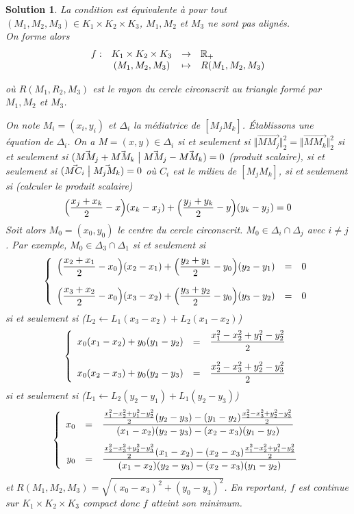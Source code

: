 \documentclass[12pt]{article}
\newtheorem{solution}{Solution}[section]
\theoremstyle{remark}
\newcommand{\function}[5]{
	$$
	\begin{array}{rccl}
		#1: & #2 & \to & #3 \\
		& #4 & \mapsto & #5
	\end{array}
	$$
}
\numberwithin{equation}{section}
\begin{document}
\begin{solution}
	La condition est équivalente à pour tout $(M_{1},M_{2},M_{3})\in K_{1}\times K_{2}\times K_{3}$, $M_{1},M_{2}$ et $M_{3}$ ne sont pas alignés.\\
	On forme alors \function{f}{K_1\times K_2\times K_3}{\R_+}{(M_1,M_2,M_3)}{R(M_1,M_2,M_3)}
	où $R(M_{1},R_{2},M_{3})$ est le rayon du cercle circonscrit au triangle formé par $M_{1},M_{2}$ et $M_{3}$.

	On note $M_{i}=(x_{i},y_{i})$ et $\Delta_{i}$ la médiatrice de $[M_{j}M_{k}]$. Établissons une équation de $\Delta_{i}$. On a $M=(x,y)\in\Delta_{i}$ si et seulement si $\Vert \vec{MM_{j}}\Vert_{2}^{2}=\Vert\vec{MM_{k}}\Vert_{2}^{2}$ si et seulement si $(\vec{MM_{j}}+\vec{MM_{k}}\bigm|\vec{MM_{j}}-\vec{MM_{k}})=0$ (produit scalaire), si et seulement si $(\vec{MC_{i}}\bigm|\vec{M_{j}M_{k}})=0$ où $C_{i}$ est le milieu de $[M_{j}M_{k}]$, si et seulement si (calculer le produit scalaire)
	$$\Bigl(\frac{x_{j}+x_{k}}{2}-x\Bigr)(x_{k}-x_{j})+\Bigl(\frac{y_{j}+y_{k}}{2}-y\Bigr)(y_{k}-y_{j})=0$$
	Soit alors $M_{0}=(x_{0},y_{0})$ le centre du cercle circonscrit. $M_{0}\in\Delta_{i}\cap\Delta_{j}$ avec $i\neq j$. Par exemple, $M_{0}\in\Delta_{3}\cap\Delta_{1}$ si et seulement si
	$$
	\left\{
		\begin{array}[]{rcl}
			\Bigl(\dfrac{x_{2}+x_{1}}{2}-x_{0}\Bigr)(x_{2}-x_{1})+\Bigl(\dfrac{y_{2}+y_{1}}{2}-y_{0}\Bigr)(y_{2}-y_{1}) &= &0\\[0.5cm]
			\Bigl(\dfrac{x_{3}+x_{2}}{2}-x_{0}\Bigr)(x_{3}-x_{2})+\Bigl(\dfrac{y_{3}+y_{2}}{2}-y_{0}\Bigr)(y_{3}-y_{2}) &= &0
		\end{array}	
	\right.
	$$
	si et seulement si ($L_{2}\leftarrow L_{1}(x_{3}-x_{2})+L_{2}(x_{1}-x_{2})$)
	$$
	\left\{
		\begin{array}[]{rcl}
			x_{0}(x_{1}-x_{2})+y_{0}(y_{1}-y_{2})&=&\dfrac{x_{1}^{2}-x_{2}^{2}+y_{1}^{2}-y_{2}^{2}}{2}\\[0.5cm]
			x_{0}(x_{2}-x_{3})+y_{0}(y_{2}-y_{3})&=&\dfrac{x_{2}^{2}-x_{3}^{2}+y_{2}^{2}-y_{3}^{2}}{2}
		\end{array}	
	\right.
	$$
	si et seulement si ($L_{1}\leftarrow L_{2}(y_{2}-y_{1})+L_{1}(y_{2}-y_{3})$)
	$$
	\left\{
		\begin{array}[]{rcl}
			x_{0} &= & \dfrac{\frac{x_{1}^{2}-x_{2}^{2}+y_{1}^{2}-y_{2}^{2}}{2}(y_{2}-y_{3})-(y_{1}-y_{2})\frac{x_{2}^{2}-x_{3}^{2}+y_{2}^{2}-y_{3}^{2}}{2}}{(x_{1}-x_{2})(y_{2}-y_{3})-(x_{2}-x_{3})(y_{1}-y_{2})}\\[0.5cm]
			y_{0} &= & \dfrac{\frac{x_{2}^{2}-x_{3}^{2}+y_{2}^{2}-y_{3}^{2}}{2}(x_{1}-x_{2})-(x_{2}-x_{3})\frac{x_{1}^{2}-x_{2}^{2}+y_{1}^{2}-y_{2}^{2}}{2}}{(x_{1}-x_{2})(y_{2}-y_{3})-(x_{2}-x_{3})(y_{1}-y_{2})}
		\end{array}	
	\right.
	$$
	et $R(M_{1},M_{2},M_{3})=\sqrt{(x_{0}-x_{3})^{2}+(y_{0}-y_{3})^{2}}$. En reportant, $f$ est continue sur $K_{1}\times K_{2}\times K_{3}$ compact donc $f$ atteint son minimum.
\end{solution}
\end{document}
